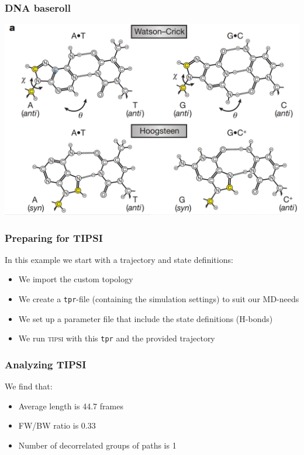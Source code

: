 \documentclass[hyperref={pdfpagelabels=false}]{beamer}
\begin{document}
\begin{frame}
\frametitle{DNA baseroll} 
\begin{center}
\includegraphics[scale=0.2]{images/pairing.png}
\end{center}
\end{frame}

\begin{frame}
\frametitle{Preparing for \textsc{TIPSI}} 
In this example we start with a trajectory and state definitions:
\begin{itemize}
\item We import the custom topology
\item We create a \texttt{tpr}-file (containing the simulation settings) to suit our MD-needs
\item We set up a parameter file that include the state definitions (H-bonds)
\item We run \textsc{tipsi} with this \texttt{tpr} and the provided trajectory
\end{itemize}
\end{frame}

\begin{frame}
\frametitle{Analyzing \textsc{TIPSI}}

We find that:

\begin{itemize}
\item Average length is 44.7 frames
\item FW/BW ratio is 0.33
\item Number of decorrelated groups of paths is 1
\end{itemize}
\end{frame}
\end{document}
